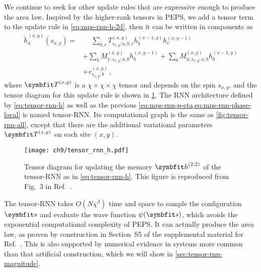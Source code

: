 We continue to seek for other update rules that are expressive enough to produce the area law. Inspired by the higher-rank tensors in PEPS, we add a tensor term to the update rule in \cref{eq:mps-rnn-h-2d}, then it can be written in components as
\begin{align}
\tilde{h}^{(x, y)}_a(s_{x, y}) = &\phantom{{}+{}} \sum_{b, c} T^{(x, y)}_{s_{x, y}; a, b, c} h^{(x - 1, y)}_b h^{(x, y - 1)}_c \nonumber \\
&+ \sum_b M^{(x, y)}_{\text{y}; s_{x, y}; a, b} h^{(x, y - 1)}_b
+ \sum_b M^{(x, y)}_{\text{x}; s_{x, y}; a, b} h^{(x - 1, y)}_b \nonumber \\
&+ v^{(x, y)}_{s_{x, y}; b}\,,
\label{eq:tensor-rnn-h}
\end{align}
where $\mT^{(x, y)}$ is a $\chi \times \chi \times \chi$ tensor and depends on the spin $s_{x, y}$, and the tensor diagram for this update rule is shown in \cref{fig:tensor-rnn-h}. The RNN architecture defined by \cref{eq:tensor-rnn-h} as well as the previous \cref{eq:mps-rnn-p-eta,eq:mps-rnn-phase-local} is named tensor-RNN. Its computational graph is the same as \cref{fig:tensor-rnn-all}, except that there are the additional variational parameters $\mT^{(x, y)}$ on each site $(x, y)$.

\begin{figure}[htb]
\centering
\texttt{[image: ch9/tensor\_rnn\_h.pdf]}
\caption[Tensor diagram for memory update of tensor-RNN]{
Tensor diagram for updating the memory $\vh^{(2, 2)}$ of the tensor-RNN as in \cref{eq:tensor-rnn-h}.
This figure is reproduced from Fig.~3 in Ref.~\cite{wu2023tensor}.
}
\label{fig:tensor-rnn-h}
\end{figure}

The tensor-RNN takes $O(N \chi^3)$ time and space to sample the configuration $\vs$ and evaluate the wave function $\psi(\vs)$, which avoids the exponential computational complexity of PEPS. It can actually produce the area law, as proven by construction in Section~S5 of the supplemental material for Ref.~\cite{wu2023tensor}. This is also supported by numerical evidence in systems more common than that artificial construction, which we will show in \cref{sec:tensor-rnn-magnitude}.

